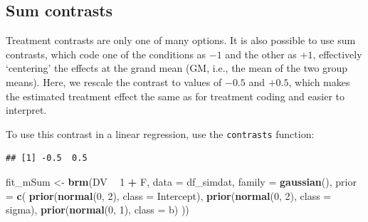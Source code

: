 \documentclass[12pt,]{krantz}
\newenvironment{Shaded}{\begin{snugshade}}{\end{snugshade}}
\newcommand{\KeywordTok}[1]{\textcolor[rgb]{0.13,0.29,0.53}{\textbf{#1}}}
\newcommand{\DataTypeTok}[1]{\textcolor[rgb]{0.13,0.29,0.53}{#1}}
\newcommand{\DecValTok}[1]{\textcolor[rgb]{0.00,0.00,0.81}{#1}}
\newcommand{\FloatTok}[1]{\textcolor[rgb]{0.00,0.00,0.81}{#1}}
\newcommand{\StringTok}[1]{\textcolor[rgb]{0.31,0.60,0.02}{#1}}
\newcommand{\OperatorTok}[1]{\textcolor[rgb]{0.81,0.36,0.00}{\textbf{#1}}}
\newcommand{\NormalTok}[1]{#1}
\theoremstyle{definition}
\theoremstyle{definition}
\theoremstyle{definition}
\theoremstyle{remark}
\begin{document}
\subsection{Sum contrasts}\label{effectcoding}

Treatment contrasts are only one of many options. It is also possible to
use sum contrasts, which code one of the conditions as \(-1\) and the
other as \(+1\), effectively `centering' the effects at the grand mean
(GM, i.e., the mean of the two group means). Here, we rescale the
contrast to values of \(-0.5\) and \(+0.5\), which makes the estimated
treatment effect the same as for treatment coding and easier to
interpret.

To use this contrast in a linear regression, use the \texttt{contrasts}
function:

\begin{Shaded}
\end{Shaded}

\begin{verbatim}
## [1] -0.5  0.5
\end{verbatim}

\begin{Shaded}
\begin{Highlighting}[]
\NormalTok{fit_mSum <-}\StringTok{ }\KeywordTok{brm}\NormalTok{(DV }\OperatorTok{~}\StringTok{ }\DecValTok{1} \OperatorTok{+}\StringTok{ }\NormalTok{F,}
                 \DataTypeTok{data =}\NormalTok{ df_simdat,}
                 \DataTypeTok{family =} \KeywordTok{gaussian}\NormalTok{(),}
                 \DataTypeTok{prior =} \KeywordTok{c}\NormalTok{(}
                     \KeywordTok{prior}\NormalTok{(}\KeywordTok{normal}\NormalTok{(}\DecValTok{0}\NormalTok{, }\DecValTok{2}\NormalTok{), }\DataTypeTok{class =}\NormalTok{ Intercept),}
                     \KeywordTok{prior}\NormalTok{(}\KeywordTok{normal}\NormalTok{(}\DecValTok{0}\NormalTok{, }\DecValTok{2}\NormalTok{), }\DataTypeTok{class =}\NormalTok{ sigma),}
                     \KeywordTok{prior}\NormalTok{(}\KeywordTok{normal}\NormalTok{(}\DecValTok{0}\NormalTok{, }\DecValTok{1}\NormalTok{), }\DataTypeTok{class =}\NormalTok{ b)}
\NormalTok{                 )) }
\end{Highlighting}
\end{Shaded}
\end{document}
